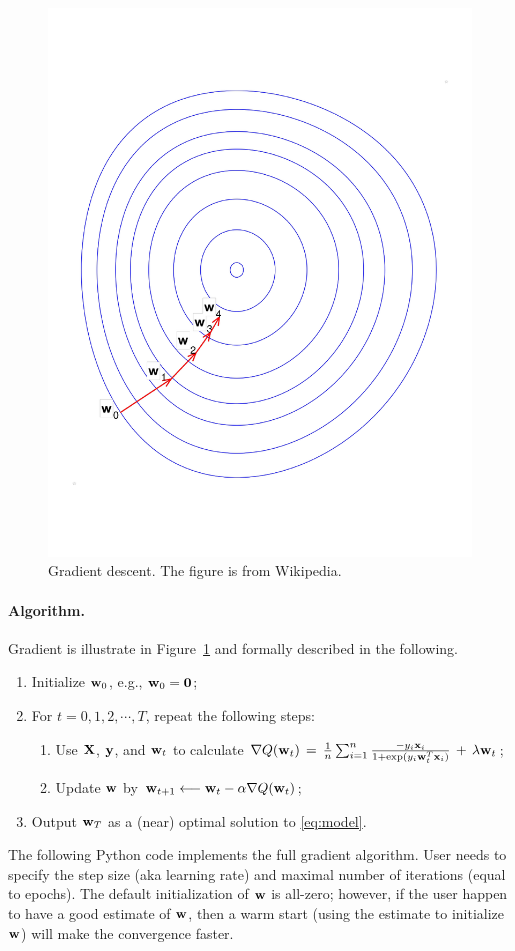 \documentclass[11pt]{article}
\numberwithin{equation}{section}
\def\w{{\bf w}}
\def\X{{\bf X}}
\def\x{{\bf x}}
\def\y{{\bf y}}
\def\0{{\bf 0}}
\begin{document}
\begin{figure}[!h]
	\centering
	\includegraphics[width=0.5\linewidth]{figures/gradient_descent.pdf}
	\caption{Gradient descent.
		The figure is from Wikipedia.}
	\label{fig:gradient_descent}
\end{figure}


\paragraph{Algorithm.}
Gradient is illustrate in Figure~\ref{fig:gradient_descent} and formally described in the following.
\begin{enumerate}
	\item 
	Initialize $\w_0$, e.g., $\w_0 = \0$;
	\item
	For $t = 0, 1, 2, \cdots , T$, repeat the following steps:
	\begin{enumerate}
		\item 
		Use $\X$, $\y$, and $\w_t$ to calculate
		$\nabla Q (\w_t) \, = \, \frac{1}{n} \sum_{i=1}^n \frac{ - y_i \x_i }{1+\exp({y_i \w_t^T \x_i})} \, + \, \lambda \w_t $;
		\item
		Update $\w$ by
		$\w_{t+1} \longleftarrow \w_t - \alpha \nabla Q (\w_t)$;
	\end{enumerate}
	\item
	Output $\w_{T}$ as a (near) optimal solution to \eqref{eq:model}.
\end{enumerate}




The following Python code implements the full gradient algorithm.
User needs to specify the step size (aka learning rate) and maximal number of iterations (equal to epochs).
The default initialization of $\w$ is all-zero;
however, if the user happen to have a good estimate of $\w$, then a warm start (using the estimate to initialize $\w$) will make the convergence faster.
\end{document}
